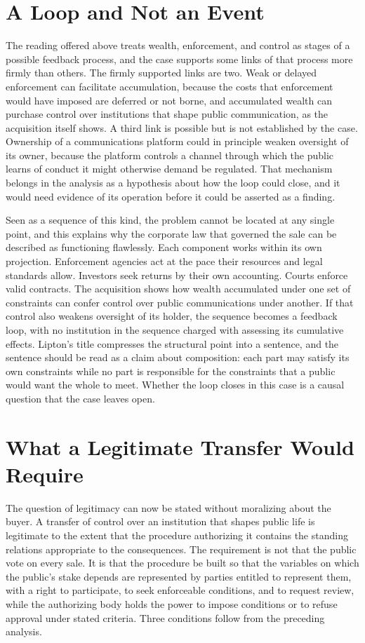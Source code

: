 \documentclass[11pt]{article}
\theoremstyle{definition}
\begin{document}
\section{A Loop and Not an Event}

The reading offered above treats wealth, enforcement, and control as stages of a possible feedback process, and the case supports some links of that process more firmly than others. The firmly supported links are two. Weak or delayed enforcement can facilitate accumulation, because the costs that enforcement would have imposed are deferred or not borne, and accumulated wealth can purchase control over institutions that shape public communication, as the acquisition itself shows. A third link is possible but is not established by the case. Ownership of a communications platform could in principle weaken oversight of its owner, because the platform controls a channel through which the public learns of conduct it might otherwise demand be regulated. That mechanism belongs in the analysis as a hypothesis about how the loop could close, and it would need evidence of its operation before it could be asserted as a finding.

Seen as a sequence of this kind, the problem cannot be located at any single point, and this explains why the corporate law that governed the sale can be described as functioning flawlessly. Each component works within its own projection. Enforcement agencies act at the pace their resources and legal standards allow. Investors seek returns by their own accounting. Courts enforce valid contracts. The acquisition shows how wealth accumulated under one set of constraints can confer control over public communications under another. If that control also weakens oversight of its holder, the sequence becomes a feedback loop, with no institution in the sequence charged with assessing its cumulative effects. Lipton's title compresses the structural point into a sentence, and the sentence should be read as a claim about composition: each part may satisfy its own constraints while no part is responsible for the constraints that a public would want the whole to meet. Whether the loop closes in this case is a causal question that the case leaves open.

\section{What a Legitimate Transfer Would Require}

The question of legitimacy can now be stated without moralizing about the buyer. A transfer of control over an institution that shapes public life is legitimate to the extent that the procedure authorizing it contains the standing relations appropriate to the consequences. The requirement is not that the public vote on every sale. It is that the procedure be built so that the variables on which the public's stake depends are represented by parties entitled to represent them, with a right to participate, to seek enforceable conditions, and to request review, while the authorizing body holds the power to impose conditions or to refuse approval under stated criteria. Three conditions follow from the preceding analysis.
\end{document}
